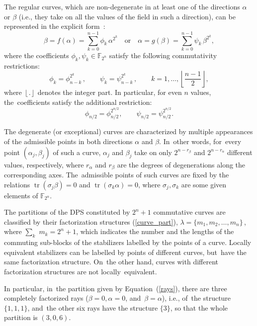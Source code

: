 \documentclass[quantumrep,article,accept,pdftex,moreauthors]{Definitions/mdpi}
\DeclareMathOperator{\tr}{tr}
\begin{document}
The regular curves, which are non-degenerate in at least one of the directions
$\alpha$ or $\beta$ (i.e., they take on all the values of the field in such a
direction), can be represented in the explicit form~\cite{GS2}:
\begin{equation}
  \beta = f(\alpha)
  = \sum_{k=0}^{n-1} \phi_{k} \, \alpha^{2^{k}}
  \quad \text{or} \quad
  \alpha = g(\beta) = \sum_{k=0}^{n-1} \psi_{k}\,\beta^{2^{k}},
  \label{RC}
\end{equation}
where the coefficients $\phi_{k},\psi_{k} \in \mathbb{F}_{2^{n}}$ satisfy the
following commutativity restrictions:
\begin{equation}
  \phi_{k} = \phi_{n-k}^{2^{k}}\,,
  \qquad \psi_{k} = \psi_{n-k}^{2^{k}}\,,
  \qquad k=1,\ldots, \left\lfloor \frac{n-1}{2}\right\rfloor,
  \label{Acc}
\end{equation}
where $\left\lfloor . \right\rfloor$ denotes the integer part. In particular,
for even $n$ values, the~coefficients satisfy the additional restriction:
\begin{equation}
  \phi_{n/2} = \phi_{n/2}^{2^{n/2}},
  \qquad \psi_{n/2} = \psi_{n/2}^{2^{n/2}}.
\end{equation}

The degenerate (or exceptional) curves are characterized by multiple appearances
of the admissible points in both directions $\alpha $ and $\beta$. In~other
words, for~every point $(\alpha_{j},\beta_{j})$ of such a curve, $\alpha_{j}$
and $\beta_{j}$ take on only $2^{n-r_{\beta}}$ and $2^{n-r_{\alpha}}$ different
values, respectively, where $r_{\alpha}$ and $r_{\beta}$ are the degrees of
degenerations along the corresponding axes.  The~admissible points of such
curves are fixed by the relations $\tr(\sigma_{j}\beta)=0$ and
$\tr(\sigma_{k}\alpha)=0$, where $\sigma_{j}, \sigma_{k}$ are some given elements
of $\mathbb{F}_{2^{n}}$.

The partitions of the DPS constituted by $2^{n}+1$ commutative curves are
classified by their factorization structures (\ref{curve_part}),
$\lambda=\{m_{1},m_{2},\ldots,m_{n}\}\,$, where $\sum_{k}$ $m_{k}=2^{n}+1$,
which indicates the number and the lengths of the commuting sub-blocks of the
stabilizers labelled by the points of a curve. Locally equivalent stabilizers
can be labelled by points of different curves, but~have the same factorization
structure. On~the other hand, curves with different factorization structures are
not locally~equivalent.

In particular, in~the partition given by Equation~(\ref{rays}), there are three
completely factorized rays ($\beta = 0, \alpha = 0$, and~$\beta = \alpha$),
i.e., of~the structure $\{1,1,1\}$, and~the other six rays have the structure
$\{3\}$, so that the whole partition is $(3,0,6)$.
\end{document}
